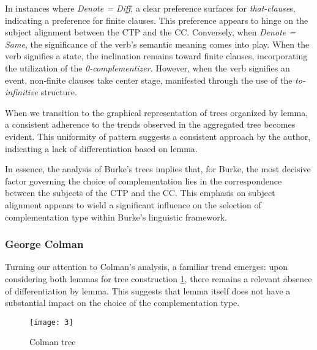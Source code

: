 \documentclass[final]{clv3} %
\begin{document}
In instances where \textit{\textit{Denote} = Diff}, a clear preference surfaces for \textit{that-clause}s, indicating a preference for finite clauses. This preference appears to hinge on the subject alignment between the CTP and the CC. Conversely, when \textit{\textit{Denote} = Same}, the significance of the verb's semantic meaning comes into play. When the verb signifies a state, the inclination remains toward finite clauses, incorporating the utilization of the \textit{\textit{0-complementizer}.} However, when the verb signifies an event, non-finite clauses take center stage, manifested through the use of the \textit{\textit{to-infinitive}} structure.

When we transition to the graphical representation of trees organized by lemma, a consistent adherence to the trends observed in the aggregated tree becomes evident. This uniformity of pattern suggests a consistent approach by the author, indicating a lack of differentiation based on lemma.

In essence, the analysis of Burke's trees implies that, for Burke, the most decisive factor governing the choice of complementation lies in the correspondence between the subjects of the CTP and the CC. This emphasis on subject alignment appears to wield a significant influence on the selection of complementation type within Burke's linguistic framework.


\subsubsection{George Colman}

Turning our attention to Colman’s analysis, a familiar trend emerges: upon considering both lemmas for tree construction \cref{fig:5}, there remains a relevant absence of differentiation by lemma. This suggests that lemma itself does not have a substantial impact on the choice of the complementation type.

\begin{figure}[htpb]
    \centering
    \texttt{[image: 3]}
    \caption{Colman tree}
    \label{fig:5}
\end{figure}
\end{document}
